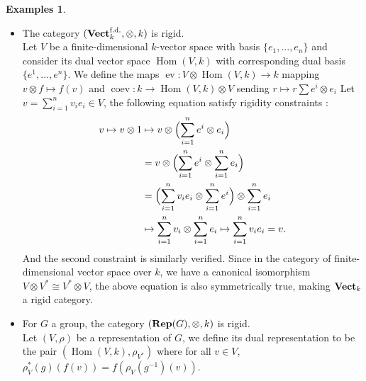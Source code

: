 \documentclass{article}
\theoremstyle{plain}
\theoremstyle{definition}
\newtheorem{examples}[theorem]{Examples}
\DeclareMathOperator{\Hom}{Hom}
\DeclareMathOperator{\ev}{ev}
\DeclareMathOperator{\coev}{coev}
\DeclareMathOperator{\Vect}{\bf{Vect}}
\DeclareMathOperator{\Rep}{\bf{Rep}}
\begin{document}
\begin{examples}\textbf{ }
\begin{itemize}
    \item[$a)$] The category $(\Vect^{\text{f.d.}}_k, \otimes, k)$ is rigid.\\
    Let $V$ be a finite-dimensional $k$-vector space with basis $\{e_1,...,e_n\}$ and consider its dual vector space $\Hom(V,k)$ with corresponding dual basis $\{e^1,...,e^n\}$.
    We define the maps $\ev: V\otimes \Hom(V,k)\rightarrow k$ mapping $v\otimes f\mapsto f(v)$ 
    and $\coev : k\rightarrow \Hom(V,k)\otimes V$ sending $r\mapsto r\sum e^i\otimes e_i$
    Let $v = \sum_{i=1}^n v_ie_i\in V$, the following equation satisfy rigidity constraints :
    \begin{equation*}
    \begin{split}
        v\mapsto v\otimes 1 & \mapsto v\otimes \Bigl(\sum^n_{i=1}e^i\otimes e_i\Bigr)\\
        & = v \otimes \Bigl(\sum^n_{i=1}e^i \otimes \sum^n_{i=1}e_i\Bigr)\\
        & = \Bigl(\sum^n_{i=1} v_ie_i \otimes \sum^n_{i=1} e^i\Bigr)\otimes \sum^n_{i=1} e_i\\
        & \mapsto \sum^n_{i=1} v_i \otimes \sum^n_{i=1} e_i \mapsto \sum^n_{i=1} v_ie_i = v.
    \end{split}
    \end{equation*}
    And the second constraint is similarly verified. 
    Since in the category of finite-dimensional vector space over $k$, we have a canonical isomorphism $V\otimes V^*\cong V^*\otimes V$, the above equation is also symmetrically true, making $\Vect_k$ a rigid category.

    
    \item[$b)$] For $G$ a group, the category $(\Rep(G), \otimes, k)$ is rigid.\\
    Let $(V,\rho)$ be a representation of $G$, we define its dual representation to be the pair $(\Hom(V,k),\rho_{V^*})$ where for all $v\in V$, $\rho_V^*(g)(f(v)) = f(\rho_V(g^{-1})(v))$.
    

\end{itemize}
\end{examples}
\end{document}
